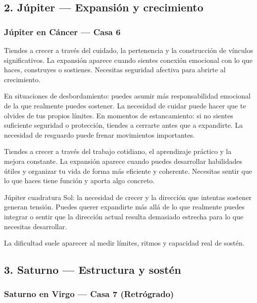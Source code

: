 \documentclass[11pt,a4paper]{article}
\begin{document}
\subsection{2. Júpiter — Expansión y crecimiento}

\subsubsection*{
Júpiter en Cáncer
— Casa 6
}

Tiendes a crecer a través del cuidado, la pertenencia y la construcción de vínculos significativos. La expansión aparece cuando sientes conexión emocional con lo que haces, construyes o sostienes. Necesitas seguridad afectiva para abrirte al crecimiento.

En situaciones de desbordamiento: puedes asumir más responsabilidad emocional de la que realmente puedes sostener. La necesidad de cuidar puede hacer que te olvides de tus propios límites. En momentos de estancamiento: si no sientes suficiente seguridad o protección, tiendes a cerrarte antes que a expandirte. La necesidad de resguardo puede frenar movimientos importantes.

Tiendes a crecer a través del trabajo cotidiano, el aprendizaje práctico y la mejora constante. La expansión aparece cuando puedes desarrollar habilidades útiles y organizar tu vida de forma más eficiente y coherente. Necesitas sentir que lo que haces tiene función y aporta algo concreto.

Júpiter cuadratura Sol: la necesidad de crecer y la dirección que intentas sostener generan tensión. Puedes querer expandirte más allá de lo que realmente puedes integrar o sentir que la dirección actual resulta demasiado estrecha para lo que necesitas desarrollar.

La dificultad suele aparecer al medir límites, ritmos y capacidad real de sostén.

\vspace{0.8cm}


\subsection{3. Saturno — Estructura y sostén}

\subsubsection*{
Saturno en Virgo
— Casa 7 (Retrógrado)
}
\end{document}
